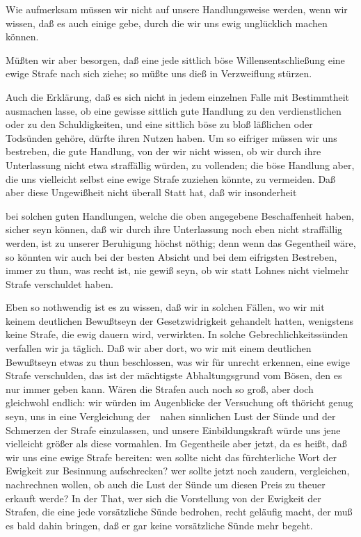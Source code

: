 \begin{aufza}
\begin{aufzb}
\begin{aufzc}
\item Wie aufmerksam müssen wir nicht auf unsere Handlungsweise werden, wenn wir wissen, daß es auch einige gebe, durch die wir uns ewig unglücklich machen können.
\item Müßten wir aber besorgen, daß eine jede sittlich böse Willensentschließung eine ewige Strafe nach sich ziehe; so müßte uns dieß in Verzweiflung stürzen.
\end{aufzc}
\end{aufzb}
\item Auch die Erklärung, daß es sich nicht in jedem einzelnen Falle mit Bestimmtheit ausmachen lasse, ob eine gewisse sittlich gute Handlung zu den verdienstlichen oder zu den Schuldigkeiten, und eine sittlich böse zu bloß läßlichen oder Todsünden gehöre, dürfte ihren Nutzen haben. Um so eifriger müssen wir uns bestreben, die gute Handlung, von der wir nicht wissen, ob wir durch ihre Unterlassung nicht etwa straffällig würden, zu vollenden; die böse Handlung aber, die uns vielleicht selbst eine ewige Strafe zuziehen könnte, zu vermeiden. Daß aber diese Ungewißheit nicht überall Statt hat, daß wir insonderheit
\begin{aufzb}
\item bei solchen guten Handlungen, welche die oben angegebene Beschaffenheit haben, sicher seyn können, daß wir durch ihre Unterlassung noch eben nicht straffällig werden, ist zu unserer Beruhigung höchst nöthig; denn wenn das Gegentheil wäre, so könnten wir auch bei der besten Absicht und bei dem eifrigsten Bestreben, immer zu thun, was recht ist, nie gewiß seyn, ob wir statt Lohnes nicht vielmehr Strafe verschuldet haben.
\item Eben so nothwendig ist es zu wissen, daß wir in solchen Fällen, wo wir mit keinem deutlichen Bewußtseyn der Gesetzwidrigkeit gehandelt hatten, wenigstens keine Strafe, die ewig dauern wird, verwirkten. In solche Gebrechlichkeitssünden verfallen wir ja täglich. Daß wir aber dort, wo wir mit einem deutlichen Bewußtseyn etwas zu thun beschlossen, was wir für unrecht erkennen, eine ewige Strafe verschulden, das ist der mächtigste Abhaltungsgrund vom Bösen, den es nur immer geben kann. Wären die Strafen auch noch so groß, aber doch gleichwohl endlich: wir würden im Augenblicke der Versuchung oft thöricht genug seyn, uns in eine Vergleichung der~\ nahen sinnlichen Lust der Sünde und der Schmerzen der Strafe einzulassen, und unsere Einbildungskraft würde uns jene vielleicht größer als diese vormahlen. Im Gegentheile aber jetzt, da es heißt, daß wir uns eine ewige Strafe bereiten: wen sollte nicht das fürchterliche Wort der Ewigkeit zur Besinnung aufschrecken? wer sollte jetzt noch zaudern, vergleichen, nachrechnen wollen, ob auch die Lust der Sünde um diesen Preis zu theuer erkauft werde? In der That, wer sich die Vorstellung von der Ewigkeit der Strafen, die eine jede vorsätzliche Sünde bedrohen, recht geläufig macht, der muß es bald dahin bringen, daß er gar keine vorsätzliche Sünde mehr begeht.

\end{aufzb}
\end{aufza}

